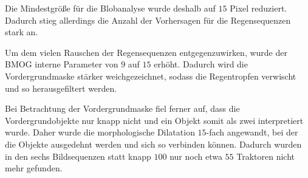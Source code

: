 \begin{figure}[ht]
\end{figure}

Die Mindestgröße für die Blobanalyse wurde deshalb auf $15$ Pixel reduziert.
Dadurch stieg allerdings die Anzahl der Vorhersagen für die Regensequenzen stark an.

Um dem vielen Rauschen der Regensequenzen entgegenzuwirken, wurde der \ac{BMOG} interne Parameter  von $9$ auf $15$ erhöht.
Dadurch wird die Vordergrundmaske stärker weichgezeichnet, sodass die Regentropfen verwischt und so herausgefiltert werden.

Bei Betrachtung der Vordergrundmaske fiel ferner auf, dass die Vordergrundobjekte nur knapp nicht  und ein Objekt somit als zwei interpretiert wurde.
Daher wurde die morphologische Dilatation $15$-fach angewandt, bei der die Objekte ausgedehnt werden und sich so verbinden können.
Dadurch wurden in den sechs Bildsequenzen statt knapp $100$ nur noch etwa $55$ Traktoren nicht mehr gefunden.

